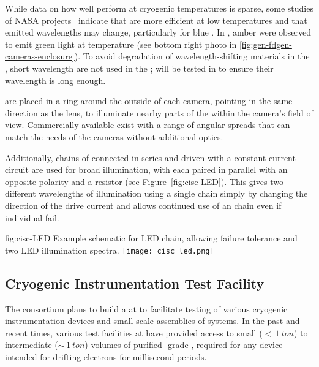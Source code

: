While data on how well  perform at cryogenic temperatures
is sparse, some studies of NASA projects~\cite{Carron:2017zzz}
indicate that  are more efficient at low temperatures and
that emitted wavelengths may change, particularly for blue
.  In , amber  were observed  to
emit green light at  temperature (see bottom right photo
in \ref{fig:gen-fdgen-cameras-enclosure}).  To avoid degradation of
wavelength-shifting materials in the , short wavelength
 are not used in the ;  will be tested
in  to ensure their wavelength is long enough.


 are placed in a ring around the outside of each
camera, pointing in the same direction as the lens, to 
illuminate nearby parts of the  within the camera's field of
view. Commercially available  exist with
a range of angular spreads that can match the needs of the
cameras without additional optics.

Additionally, chains of  connected in series and driven with a
constant-current circuit are used for broad illumination, with each
 paired in parallel with an opposite polarity  and a resistor
(see Figure~\ref{fig:cisc-LED}).
This gives two different wavelengths of illumination using a single chain simply by changing the direction of the drive current and allows continued use of an  chain even if individual  fail.

\begin{dunefigure}{fig:cisc-LED}
  {Example schematic for LED chain, allowing failure tolerance and two LED illumination spectra.}
  \texttt{[image: cisc\_led.png]}
\end{dunefigure}


\subsection{Cryogenic Instrumentation Test Facility}
The  consortium plans to build a  at  to facilitate testing of various cryogenic instrumentation devices and small-scale assemblies of  systems. 
In the past and recent times, various test facilities at  have provided access to small ($<\,\SI{1}{ton}$) to intermediate ($\sim\,\SI{1}{ton}$) volumes of purified -grade , required for %
any device intended for drifting electrons for millisecond periods. 

